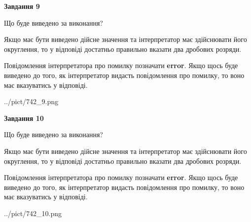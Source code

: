 \documentclass[12pt, ukrainian]{article}
\begin{document}
{\begin {Large}
{\begin {center}\textbf{Завдання 9}\end {center}}\par
Що буде виведено за виконання? \par

Якщо має бути виведено дійсне значення та інтерпретатор має здійснювати його округлення, 
то у відповіді достатньо правильно вказати два дробових розряди.

Повідомлення інтерпретатора про помилку позначати \textbf{error}.
Якщо щось буде виведено до того, як інтерпретатор видасть повідомлення про помилку, 
то воно має вказуватись у відповіді. \par

\begin{center}
	{../pict/742_9.png}
\end{center}
\newpage

{\begin {center}\textbf{Завдання 10}\end {center}}\par
Що буде виведено за виконання? \par

Якщо має бути виведено дійсне значення та інтерпретатор має здійснювати його округлення, 
то у відповіді достатньо правильно вказати два дробових розряди.

Повідомлення інтерпретатора про помилку позначати \textbf{error}.
Якщо щось буде виведено до того, як інтерпретатор видасть повідомлення про помилку, 
то воно має вказуватись у відповіді. \par

\begin{center}
	{../pict/742_10.png}
\end{center}
\newpage

\end {Large}}
\end{document}
